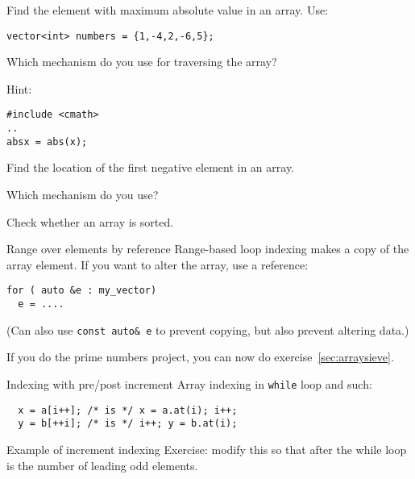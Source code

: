 \begin{exercise}
  \label{ex:array-max}
  Find the element with maximum absolute value in an array. Use:
\begin{lstlisting}
vector<int> numbers = {1,-4,2,-6,5};
\end{lstlisting}
Which mechanism do you use for traversing the array?

Hint:
\begin{lstlisting}
#include <cmath>
..
absx = abs(x);
\end{lstlisting}
\end{exercise}

\begin{exercise}
  \label{ex:array-maxidx}
  Find the location of the first negative element in an array.

  Which mechanism do you use?
\end{exercise}

\begin{exercise}
  \label{ex:array-sorted}
  Check whether an array is sorted.
\end{exercise}

\begin{block}{Range over elements by reference}
  \label{sl:array-range-ref}
  Range-based loop indexing makes a copy of the array element. If you
  want to alter the array, use a reference:
\begin{lstlisting}
for ( auto &e : my_vector)
  e = ....
\end{lstlisting}
%

(Can also use \lstinline{const auto& e} to prevent copying, but also
prevent altering data.)
\end{block}

\begin{exercise}
  If you do the prime numbers project, you can now do exercise~\ref{sec:arraysieve}.
\end{exercise}

\begin{block}{Indexing with pre/post increment}
  \label{sl:prepostindex}
Array indexing in \lstinline{while} loop and such:
\begin{lstlisting}
  x = a[i++]; /* is */ x = a.at(i); i++;
  y = b[++i]; /* is */ i++; y = b.at(i);
\end{lstlisting}
\end{block}

\begin{block}{Example of increment indexing}
  Exercise: modify this so that after the while loop  is the
  number of leading odd elements.
\end{block}


